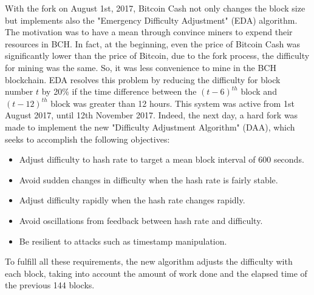 With the fork on August 1st, 2017, Bitcoin Cash not only changes the block size but 
implements also the "Emergency Difficulty Adjustment" (EDA) algorithm. The motivation was 
to have a mean through convince miners to expend their resources in BCH. In fact, at the 
beginning, even the price of Bitcoin Cash was significantly lower than the price of 
Bitcoin, due to the fork process, the difficulty for mining was the same. So, it was 
less convenience to mine in the BCH blockchain. EDA resolves this problem by reducing 
the difficulty for block number $t$ by 20\% if the time difference between the 
$(t-6)^{th}$ block and $(t-12)^{th}$ block was greater than 12 hours. This system was 
active from 1st August 2017, until 12th November 2017. Indeed, the next day, a hard fork
was made to implement the new "Difficulty Adjustment Algorithm" (DAA), which seeks to 
accomplish the following objectives:
\begin{itemize}
    \item Adjust difficulty to hash rate to target a mean block interval of 600 seconds.
    \item Avoid sudden changes in difficulty when the hash rate is fairly stable.
    \item Adjust difficulty rapidly when the hash rate changes rapidly.
    \item Avoid oscillations from feedback between hash rate and difficulty.
    \item Be resilient to attacks such as timestamp manipulation.
\end{itemize}
To fulfill all these requirements, the new algorithm adjusts the difficulty with each
block, taking into account the amount of work done and the elapsed time of the previous 
144 blocks.\cite{bitcoinabc}\cite{eda}\pagebreak
